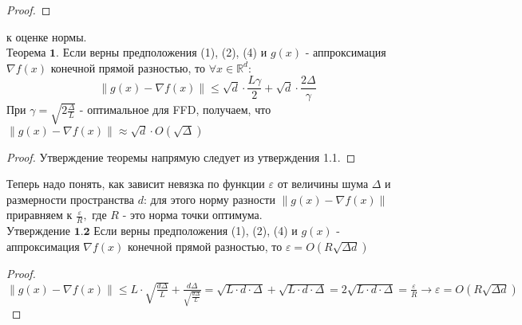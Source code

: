 \documentclass{article}
\begin{document}
\begin{doublespace}
\begin{proof}
\end{proof}
 к оценке нормы.\\
$\textbf{Теорема 1.}$ Если верны предположения (1), (2), (4) и $g(x)$ - аппроксимация $\nabla f(x)$ конечной прямой разностью, то $\forall x \in \mathds{R}^d$:$$\|g(x)-\nabla f(x)\|\leq \sqrt{d}\cdot\frac{L\gamma}{2}+\sqrt{d}\cdot\frac{2\Delta}{\gamma}$$
При $\gamma = \sqrt{2\frac{\Delta}{L}}$ - оптимальное для FFD, получаем, что  $\|g(x)-\nabla f(x)\| \approx \sqrt{d} \cdot O(\sqrt{\Delta})$
\begin{proof}
Утверждение теоремы напрямую следует из утверждения 1.1.
\end{proof}
\noindent Теперь надо понять, как зависит невязка по функции  $\varepsilon$ от величины шума $\Delta$ и размерности пространства $d$: для этого норму разности $\|g(x) - \nabla f(x) \|$ приравняем к $\frac{\varepsilon}{R},$ где $R$ - это норма точки оптимума.\\
$\textbf{Утверждение 1.2}$ Если верны предположения (1), (2), (4) и $g(x)$ - аппроксимация $\nabla f(x)$ конечной прямой разностью, то $\varepsilon = O(R \sqrt{\Delta d})$
\begin{proof}
$\|g(x) - \nabla f(x) \| \leq L \cdot \sqrt{\frac{d \Delta}{L}} + \frac{d \Delta}{\sqrt{\frac{d \Delta}{L}}} = \sqrt{L \cdot d \cdot \Delta} + \sqrt{L \cdot d \cdot \Delta} = 2\sqrt{L \cdot d \cdot \Delta} = \frac{\varepsilon}{R} \xrightarrow[]{} \varepsilon = O(R \sqrt{\Delta d})$
\end{proof}
\end{doublespace}
\end{document}

